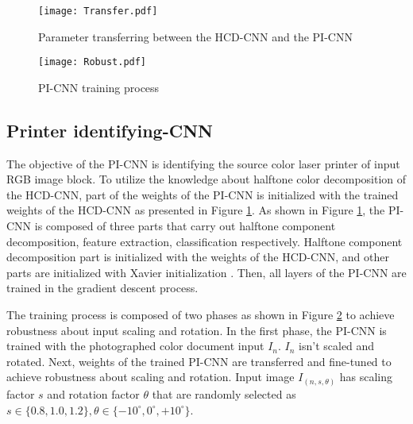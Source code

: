 \documentclass[5p, times]{elsarticle}
\begin{document}
\begin{figure}[t!]
    \centerline{\texttt{[image: Transfer.pdf]}}
    \caption{Parameter transferring between the HCD-CNN and the PI-CNN
    } \label{Transfer}
\end{figure}

\begin{figure}[t]
    \centerline{\texttt{[image: Robust.pdf]}}
    \caption{PI-CNN training process
    } \label{Robust}
\end{figure}

\subsection{Printer identifying-CNN}

The objective of the PI-CNN is identifying the source color laser printer of input RGB image block. To utilize the knowledge about halftone color decomposition of the HCD-CNN, part of the weights of the PI-CNN is initialized with the trained weights of the HCD-CNN as presented in Figure \ref{Transfer}. As shown in Figure \ref{Transfer}, the PI-CNN is composed of three parts that carry out halftone component decomposition, feature extraction, classification respectively. Halftone component decomposition part is initialized with the weights of the HCD-CNN, and other parts are initialized with Xavier initialization \cite{xavier}. Then, all layers of the PI-CNN are trained in the gradient descent process.

The training process is composed of two phases as shown in Figure \ref{Robust} to achieve robustness about input scaling and rotation. In the first phase, the PI-CNN is trained with the photographed color document input $I_n$. $I_n$ isn't scaled and rotated. Next, weights of the trained PI-CNN are transferred and fine-tuned to achieve robustness about scaling and rotation. Input image $I_{(n,s,\theta)}$ has scaling factor $s$ and rotation factor $\theta$ that are randomly selected as $s\in\{0.8,1.0,1.2\},\theta\in\{-10^\circ,0^\circ,+10^\circ\}$.
\end{document}
